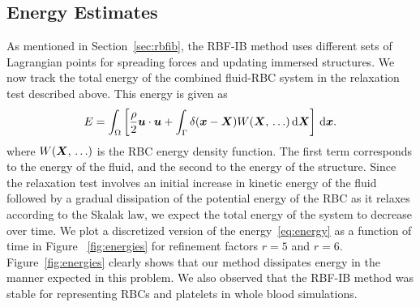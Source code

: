 \subsection{Energy Estimates}\label{sec:energy}

As mentioned in Section~\ref{sec:rbfib}, the RBF-IB method uses different sets of
Lagrangian points for spreading forces and updating immersed structures. We now track the
total energy of the combined fluid-RBC system in the relaxation test described above.
This energy is given as 
\begin{align}
    E = \int_\domain \left[\frac{\density}2\u\cdot\u + \int_\interface \Dirac(\x-\X)W(\X,\,\ldots)\d\X\right] \d\x.
\label{eq:energy}
\end{align}
where $W(\boldsymbol{X},\,\ldots)$ is the RBC energy density function. The first term corresponds to
the energy of the fluid, and the second to the energy of the structure. Since the
relaxation test involves an initial increase in kinetic energy of the fluid followed by a
gradual dissipation of the potential energy of the RBC as it relaxes according to the
Skalak law, we expect the total energy of the system to decrease over time. We plot a
discretized version of the energy~\eqref{eq:energy} as a function of time in Figure~%
\ref{fig:energies} for refinement factors $r=5$ and $r=6$. Figure~\ref{fig:energies}
clearly shows that our method dissipates energy in the manner expected in this problem.
We also observed that the RBF-IB method was stable for representing RBCs and platelets in
whole blood simulations.


